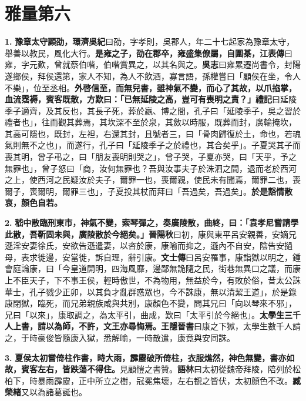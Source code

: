 \chapter{雅量第六}

\textbf{1.} \textbf{豫章太守顧劭，}{\footnotesize \textbf{環濟吳紀}曰劭，字孝則，吳郡人，年二十七起家為豫章太守，舉善以教民，風化大行。}\textbf{是雍之子，劭在郡卒，雍盛集僚屬，自圍棊，}{\footnotesize \textbf{江表傳}曰雍，字元歎，曾就蔡伯喈，伯喈賞異之，以其名與之。\textbf{吳志}曰雍累遷尚書令，封陽遂鄉侯，拜侯還第，家人不知，為人不飲酒，寡言語，孫權嘗曰「顧侯在坐，令人不樂」，位至丞相。}\textbf{外啓信至，而無兒書，雖神氣不變，而心了其故，以爪掐掌，血流霑褥，賓客既散，方歎曰：「已無延陵之高，豈可有喪明之責？」}{\footnotesize \textbf{禮記}曰延陵季子適齊，及其反也，其長子死，葬於嬴、博之間，孔子曰「延陵季子，吳之習於禮者也」，往而觀其葬焉，其坎深不至於泉，其斂以時服，既葬而封，廣輪掩坎，其高可隱也，既封，左袒，右還其封，且號者三，曰「骨肉歸復於土，命也，若魂氣則無不之也」，而遂行，孔子曰「延陵季子之於禮也，其合矣乎」。子夏哭其子而喪其明，曾子弔之，曰「朋友喪明則哭之」，曾子哭，子夏亦哭，曰「天乎，予之無罪也」，曾子怒曰「商，汝何無罪也？吾與汝事夫子於洙泗之間，退而老於西河之上，使西河之民疑汝於夫子，爾罪一也，喪爾親，使民未有聞焉，爾罪二也，喪爾子，喪爾明，爾罪三也」，子夏投其杖而拜曰「吾過矣，吾過矣」。}\textbf{於是豁情散哀，顏色自若。}

\textbf{2.} \textbf{嵇中散臨刑東市，神氣不變，索琴彈之，奏廣陵散，曲終，曰：「袁孝尼嘗請學此散，吾靳固未與，廣陵散於今絕矣。」}{\footnotesize \textbf{晉陽秋}曰初，康與東平呂安親善，安嫡兄遜淫安妻徐氏，安欲告遜遣妻，以咨於康，康喻而抑之，遜內不自安，陰告安撾母，表求徙邊，安當徙，訴自理，辭引康。\textbf{文士傳}曰呂安罹事，康詣獄以明之，鍾會庭論康，曰「今皇道開明，四海風靡，邊鄙無詭隨之民，街巷無異口之議，而康上不臣天子，下不事王侯，輕時傲世，不為物用，無益於今，有敗於俗，昔太公誅華士，孔子戮少正卯，以其負才亂群惑眾也，今不誅康，無以清絜王道」，於是錄康閉獄，臨死，而兄弟親族咸與共別，康顏色不變，問其兄曰「向以琴來不邪」，兄曰「以來」，康取調之，為太平引，曲成，歎曰「太平引於今絕也」。}\textbf{太學生三千人上書，請以為師，不許，文王亦尋悔焉。}{\footnotesize \textbf{王隱晉書}曰康之下獄，太學生數千人請之，于時豪俊皆隨康入獄，悉解喻，一時散遣，康竟與安同誅。}

\textbf{3.} \textbf{夏侯太初嘗倚柱作書，時大雨，霹靂破所倚柱，衣服燋然，神色無變，書亦如故，賓客左右，皆跌蕩不得住。}{\footnotesize 見顧愷之書贊。\textbf{語林}曰太初從魏帝拜陵，陪列於松柏下，時暴雨霹靂，正中所立之樹，冠冕焦壞，左右覩之皆伏，太初顏色不改。\textbf{臧榮緒}又以為諸葛誕也。}

